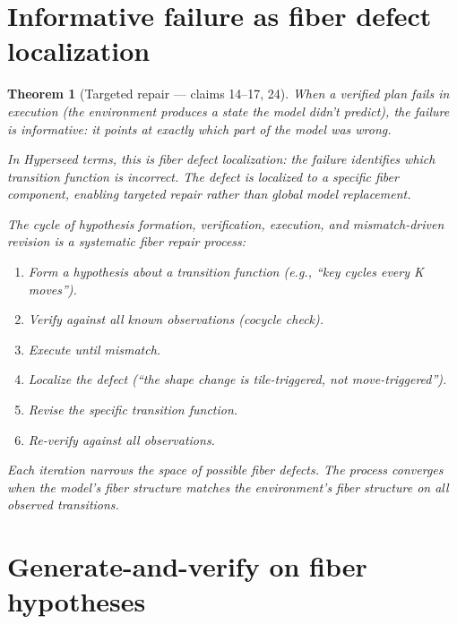 \documentclass[11pt,a4paper]{article}
\newtheorem{theorem}[definition]{Theorem}
\begin{document}
\section{Informative failure as fiber defect localization}
\label{sec:failure}

\begin{theorem}[Targeted repair --- claims 14--17, 24]
\label{thm:failure}
When a verified plan fails in execution (the environment produces a
state the model didn't predict), the failure is \emph{informative}:
it points at exactly which part of the model was wrong.

In Hyperseed terms, this is \emph{fiber defect localization}: the
failure identifies which transition function is incorrect. The defect
is localized to a specific fiber component, enabling targeted repair
rather than global model replacement.

The cycle of hypothesis formation, verification, execution, and
mismatch-driven revision is a systematic fiber repair process:
\begin{enumerate}
\item Form a hypothesis about a transition function (e.g., ``key
  cycles every K moves'').
\item Verify against all known observations (cocycle check).
\item Execute until mismatch.
\item Localize the defect (``the shape change is tile-triggered,
  not move-triggered'').
\item Revise the specific transition function.
\item Re-verify against all observations.
\end{enumerate}

Each iteration narrows the space of possible fiber defects. The
process converges when the model's fiber structure matches the
environment's fiber structure on all observed transitions.
\end{theorem}

\section{Generate-and-verify on fiber hypotheses}
\label{sec:genverify}
\end{document}
